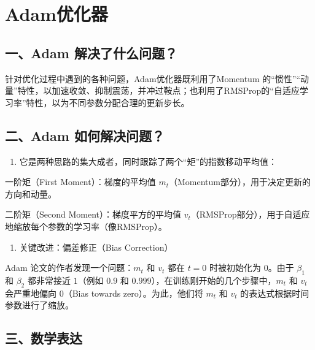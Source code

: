 \clearpage

\hypertarget{adamux4f18ux5316ux5668}{%
\section{Adam优化器}\label{adamux4f18ux5316ux5668}}

\hypertarget{ux4e00adam-ux89e3ux51b3ux4e86ux4ec0ux4e48ux95eeux9898}{%
\subsection{一、Adam 解决了什么问题？}\label{ux4e00adam-ux89e3ux51b3ux4e86ux4ec0ux4e48ux95eeux9898}}

针对优化过程中遇到的各种问题，Adam优化器既利用了Momentum 的``惯性''``动量''特性，以加速收敛、抑制震荡，并冲过鞍点；也利用了RMSProp的``自适应学习率''特性，以为不同参数分配合理的更新步长。

\hypertarget{ux4e8cadam-ux5982ux4f55ux89e3ux51b3ux95eeux9898}{%
\subsection{二、Adam 如何解决问题？}\label{ux4e8cadam-ux5982ux4f55ux89e3ux51b3ux95eeux9898}}

\begin{enumerate}
\def\labelenumi{\arabic{enumi}.}
\tightlist
\item
  它是两种思路的集大成者，同时跟踪了两个``矩''的指数移动平均值：
\end{enumerate}

一阶矩（First Moment）：梯度的平均值 \(m_t\)（Momentum部分），用于决定更新的方向和动量。

二阶矩（Second Moment）：梯度平方的平均值 \(v_t\)（RMSProp部分），用于自适应地缩放每个参数的学习率（像RMSProp）。

\begin{enumerate}
\def\labelenumi{\arabic{enumi}.}
\setcounter{enumi}{1}
\tightlist
\item
  关键改进：偏差修正（Bias Correction）
\end{enumerate}

Adam 论文的作者发现一个问题：\(m_t\) 和 \(v_t\) 都在 \(t=0\) 时被初始化为 \(0\)。由于 \(\beta_1\) 和 \(\beta_2\) 都非常接近 \(1\)（例如 \(0.9\) 和 \(0.999\)），在训练刚开始的几个步骤中，\(m_t\) 和 \(v_t\) 会严重地偏向 \(0\)（Bias towards zero）。为此，他们将 \(m_t\) 和 \(v_t\) 的表达式根据时间参数进行了缩放。

\hypertarget{ux4e09ux6570ux5b66ux8868ux8fbe-2}{%
\subsection{三、数学表达}\label{ux4e09ux6570ux5b66ux8868ux8fbe-2}}

